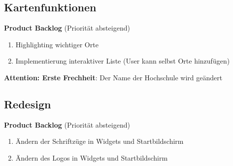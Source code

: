 \documentclass[12pt]{scrartcl}
\begin{document}
\subsection{Kartenfunktionen}
\textbf{Product Backlog} (Priorität absteigend)
\begin{enumerate}
\item Highlighting wichtiger Orte
\item Implementierung interaktiver Liste (User kann selbst Orte hinzufügen)
\end{enumerate}
\textbf{Attention: Erste Frechheit}: Der Name der Hochschule wird geändert
\subsection{Redesign}
\textbf{Product Backlog} (Priorität absteigend)
\begin{enumerate}
\item Ändern der Schriftzüge in Widgets und Startbildschirm
\item Ändern des Logos in Widgets und Startbildschirm
\end{enumerate}
\end{document}
